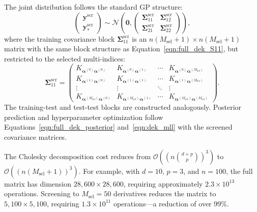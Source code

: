 \documentclass[12pt]{article}
\begin{document}
The joint distribution follows the standard GP structure:
\begin{equation}
	\label{eqn:screened_joint_dist}
	\begin{pmatrix}
		\mathbf{y}^{\text{scr}} \\
		\mathbf{y}^{\text{scr}}_*
	\end{pmatrix}
	\sim \mathcal{N}\left(
	\mathbf{0},
	\begin{pmatrix}
		\boldsymbol{\Sigma}^{\text{scr}}_{11} & \boldsymbol{\Sigma}^{\text{scr}}_{12} \\
		\boldsymbol{\Sigma}^{\text{scr}}_{21} & \boldsymbol{\Sigma}^{\text{scr}}_{22}
	\end{pmatrix}
	\right),
\end{equation}
where the training covariance block $\boldsymbol{\Sigma}^{\text{scr}}_{11}$ is an $n(M_{\text{sel}} + 1) \times n(M_{\text{sel}} + 1)$ matrix with the same block structure as Equation~\eqref{eqn:full_dek_S11}, but restricted to the selected multi-indices:
\begin{equation}
	\label{eqn:screened_S11}
	\boldsymbol{\Sigma}^{\text{scr}}_{11} =
	\begin{pmatrix} 
		K_{\boldsymbol{\alpha}^{(0)}\boldsymbol{\alpha}^{(0)}} & K_{\boldsymbol{\alpha}^{(0)}\boldsymbol{\alpha}^{(1)}} & \cdots & K_{\boldsymbol{\alpha}^{(0)}\boldsymbol{\alpha}^{(M_{\text{sel}})}} \\ 
		K_{\boldsymbol{\alpha}^{(1)}\boldsymbol{\alpha}^{(0)}} & K_{\boldsymbol{\alpha}^{(1)}\boldsymbol{\alpha}^{(1)}} & \cdots & K_{\boldsymbol{\alpha}^{(1)}\boldsymbol{\alpha}^{(M_{\text{sel}})}} \\ 
		\vdots & \vdots & \ddots & \vdots \\ 
		K_{\boldsymbol{\alpha}^{(M_{\text{sel}})}\boldsymbol{\alpha}^{(0)}} & K_{\boldsymbol{\alpha}^{(M_{\text{sel}})}\boldsymbol{\alpha}^{(1)}} & \cdots & K_{\boldsymbol{\alpha}^{(M_{\text{sel}})}\boldsymbol{\alpha}^{(M_{\text{sel}})}} 
	\end{pmatrix}.
\end{equation}
The training-test and test-test blocks are constructed analogously. Posterior prediction and hyperparameter optimization follow Equations~\eqref{eqn:full_dek_posterior} and~\eqref{eqn:dek_mll} with the screened covariance matrices.

The Cholesky decomposition cost reduces from $\mathcal{O}((n\binom{d+p}{p})^3)$ to $\mathcal{O}((n(M_{\text{sel}} + 1))^3)$. For example, with $d=10$, $p=3$, and $n=100$, the full matrix has dimension $28{,}600 \times 28{,}600$, requiring approximately $2.3 \times 10^{13}$ operations. Screening to $M_{\text{sel}} = 50$ derivatives reduces the matrix to $5{,}100 \times 5{,}100$, requiring $1.3 \times 10^{11}$ operations---a reduction of over 99\%.
\end{document}
